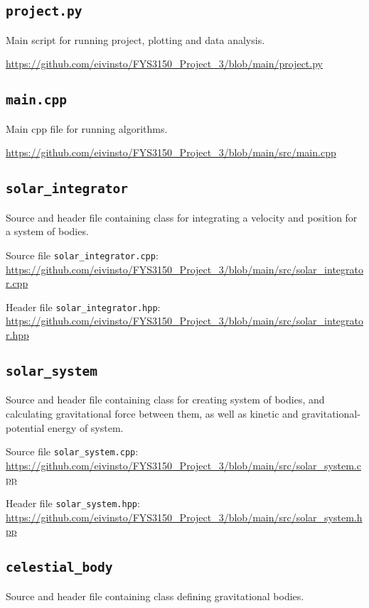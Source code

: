 \documentclass[reprint,english,notitlepage]{revtex4-1}  %
\begin{document}
\cprotect\subsection{\verb+project.py+} \label{A.1}
Main script for running project, plotting and data analysis.

\url{https://github.com/eivinsto/FYS3150_Project_3/blob/main/project.py}

\cprotect\subsection{\verb+main.cpp+} \label{A.2}
Main cpp file for running algorithms.

\url{https://github.com/eivinsto/FYS3150_Project_3/blob/main/src/main.cpp}

\cprotect\subsection{\verb+solar_integrator+} \label{A.3}
Source and header file containing class for integrating a velocity and position for a system of bodies.

Source file \verb+solar_integrator.cpp+:
\url{https://github.com/eivinsto/FYS3150_Project_3/blob/main/src/solar_integrator.cpp}

Header file \verb+solar_integrator.hpp+:
\url{https://github.com/eivinsto/FYS3150_Project_3/blob/main/src/solar_integrator.hpp}

\cprotect\subsection{\verb+solar_system+} \label{A.4}
Source and header file containing class for creating system of bodies, and calculating gravitational force between them, as well as kinetic and gravitational-potential energy of system.

Source file \verb+solar_system.cpp+:
\url{https://github.com/eivinsto/FYS3150_Project_3/blob/main/src/solar_system.cpp}

Header file \verb+solar_system.hpp+:
\url{https://github.com/eivinsto/FYS3150_Project_3/blob/main/src/solar_system.hpp}

\cprotect\subsection{\verb+celestial_body+} \label{A.5}
Source and header file containing class defining gravitational bodies.
\end{document}

